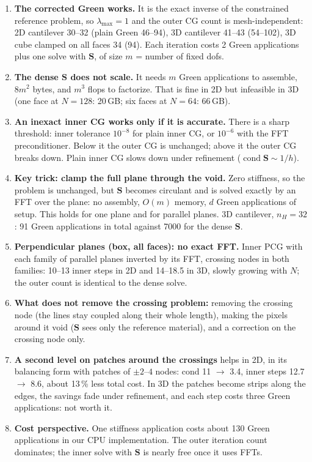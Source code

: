 \documentclass[11pt,a4paper]{article}
\begin{document}
\begin{enumerate}
  \item \textbf{The corrected Green works.} It is the exact inverse of the constrained reference problem, so
        $\lambda_{\max} = 1$ and the outer CG count is mesh-independent: 2D cantilever 30--32 (plain Green 46--94),
        3D cantilever 41--43 (54--102), 3D cube clamped on all faces 34 (94). Each iteration costs 2 Green applications
        plus one solve with $\mathbf{S}$, of size $m$ = number of fixed dofs.
  \item \textbf{The dense $\mathbf{S}$ does not scale.} It needs $m$ Green applications to assemble, $8m^2$ bytes, and
        $m^3$ flops to factorize. That is fine in 2D but infeasible in 3D (one face at $N = 128$: 20\,GB; six faces at
        $N = 64$: 66\,GB).
  \item \textbf{An inexact inner CG works only if it is accurate.} There is a sharp threshold: inner tolerance
        $10^{-8}$ for plain inner CG, or $10^{-6}$ with the FFT preconditioner. Below it the outer CG is unchanged;
        above it the outer CG breaks down. Plain inner CG slows down under refinement
        ($\operatorname{cond}\mathbf{S} \sim 1/h$).
  \item \textbf{Key trick: clamp the full plane through the void.} Zero stiffness, so the problem is unchanged, but
        $\mathbf{S}$ becomes circulant and is solved exactly by an FFT over the plane: no assembly, $O(m)$ memory,
        $d$ Green applications of setup. This holds for one plane and for parallel planes. 3D cantilever,
        $n_H = 32$: 91 Green applications in total against 7000 for the dense $\mathbf{S}$.
  \item \textbf{Perpendicular planes (box, all faces): no exact FFT.} Inner PCG with each family of parallel planes
        inverted by its FFT, crossing nodes in both families: 10--13 inner steps in 2D and 14--18.5 in 3D, slowly growing
        with $N$; the outer count is identical to the dense solve.
  \item \textbf{What does not remove the crossing problem:} removing the crossing node (the lines stay coupled along
        their whole length), making the pixels around it void ($\mathbf{S}$ sees only the reference material), and a
        correction on the crossing node only.
  \item \textbf{A second level on patches around the crossings} helps in 2D, in its balancing form with patches of
        $\pm2$--$4$ nodes: cond 11 $\to$ 3.4, inner steps 12.7 $\to$ 8.6, about 13\,\% less total cost. In 3D the patches
        become strips along the edges, the savings fade under refinement, and each step costs three Green applications:
        not worth it.
  \item \textbf{Cost perspective.} One stiffness application costs about 130 Green applications in our CPU
        implementation. The outer iteration count dominates; the inner solve with $\mathbf{S}$ is nearly free once it
        uses FFTs.
\end{enumerate}
\end{document}
